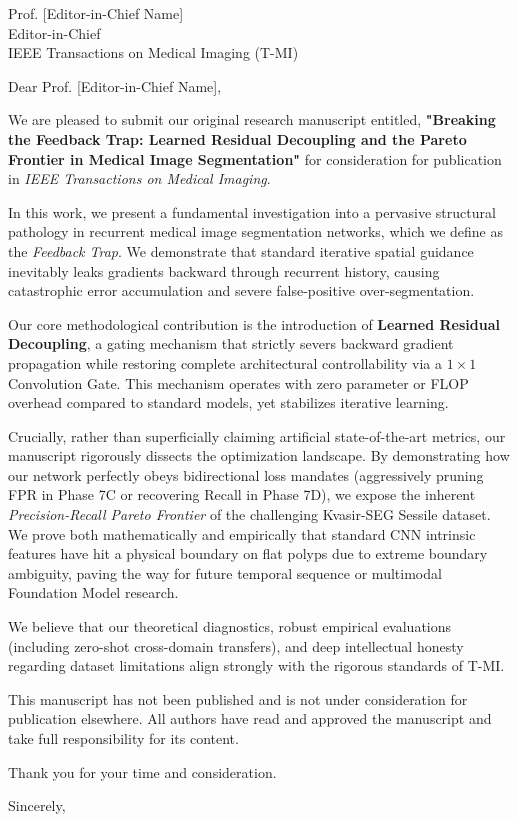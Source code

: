 \documentclass[11pt]{letter}
\begin{document}
\begin{letter}{
    Prof. [Editor-in-Chief Name] \\
    Editor-in-Chief \\
    IEEE Transactions on Medical Imaging (T-MI)
}

\opening{Dear Prof. [Editor-in-Chief Name],}

We are pleased to submit our original research manuscript entitled, \textbf{"Breaking the Feedback Trap: Learned Residual Decoupling and the Pareto Frontier in Medical Image Segmentation"} for consideration for publication in \textit{IEEE Transactions on Medical Imaging}.

In this work, we present a fundamental investigation into a pervasive structural pathology in recurrent medical image segmentation networks, which we define as the \textit{Feedback Trap}. We demonstrate that standard iterative spatial guidance inevitably leaks gradients backward through recurrent history, causing catastrophic error accumulation and severe false-positive over-segmentation. 

Our core methodological contribution is the introduction of \textbf{Learned Residual Decoupling}, a gating mechanism that strictly severs backward gradient propagation while restoring complete architectural controllability via a $1\times1$ Convolution Gate. This mechanism operates with zero parameter or FLOP overhead compared to standard models, yet stabilizes iterative learning.

Crucially, rather than superficially claiming artificial state-of-the-art metrics, our manuscript rigorously dissects the optimization landscape. By demonstrating how our network perfectly obeys bidirectional loss mandates (aggressively pruning FPR in Phase 7C or recovering Recall in Phase 7D), we expose the inherent \textit{Precision-Recall Pareto Frontier} of the challenging Kvasir-SEG Sessile dataset. We prove both mathematically and empirically that standard CNN intrinsic features have hit a physical boundary on flat polyps due to extreme boundary ambiguity, paving the way for future temporal sequence or multimodal Foundation Model research.

We believe that our theoretical diagnostics, robust empirical evaluations (including zero-shot cross-domain transfers), and deep intellectual honesty regarding dataset limitations align strongly with the rigorous standards of T-MI. 

This manuscript has not been published and is not under consideration for publication elsewhere. All authors have read and approved the manuscript and take full responsibility for its content.

Thank you for your time and consideration.

\closing{Sincerely,}

\end{letter}
\end{document}
